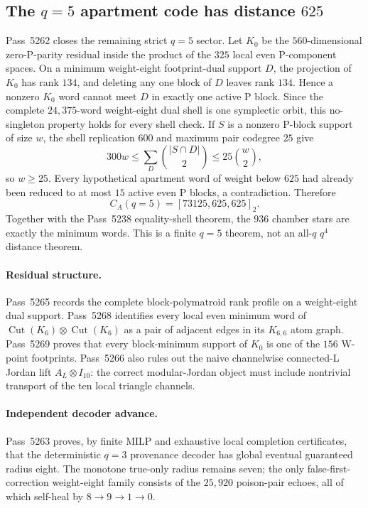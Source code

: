 \subsection{The $q=5$ apartment code has distance $625$}
Pass~5262 closes the remaining strict $q=5$ sector.  Let $K_0$ be the
$560$-dimensional zero-P-parity residual inside the product of the $325$ local
even P-component spaces.  On a minimum weight-eight footprint-dual support $D$,
the projection of $K_0$ has rank $134$, and deleting any one block of $D$ leaves
rank $134$.  Hence a nonzero $K_0$ word cannot meet $D$ in exactly one active
P block.  Since the complete $24{,}375$-word weight-eight dual shell is one
symplectic orbit, this no-singleton property holds for every shell check.
If $S$ is a nonzero P-block support of size $w$, the shell replication $600$ and
maximum pair codegree $25$ give
\[
  300w\le \sum_D { |S\cap D|\choose2}\le 25{w\choose2},
\]
so $w\ge25$.  Every hypothetical apartment word of weight below $625$ had
already been reduced to at most $15$ active even P blocks, a contradiction.
Therefore
\[
  \boxed{C_A(q=5)=[73125,625,625]_2}.
\]
Together with the Pass~5238 equality-shell theorem, the $936$ chamber stars are
exactly the minimum words.  This is a finite $q=5$ theorem, not an all-$q$
$q^4$ distance theorem.

\paragraph{Residual structure.}
Pass~5265 records the complete block-polymatroid rank profile on a weight-eight
dual support.  Pass~5268 identifies every local even minimum word of
$\operatorname{Cut}(K_6)\otimes\operatorname{Cut}(K_6)$ as a pair of adjacent
edges in its $K_{6,6}$ atom graph.  Pass~5269 proves that every block-minimum
support of $K_0$ is one of the $156$ W-point footprints.  Pass~5266 also rules
out the naive channelwise connected-L Jordan lift $A_L\otimes I_{10}$: the
correct modular-Jordan object must include nontrivial transport of the ten local
triangle channels.

\paragraph{Independent decoder advance.}
Pass~5263 proves, by finite MILP and exhaustive local completion certificates,
that the deterministic $q=3$ provenance decoder has global eventual guaranteed
radius eight.  The monotone true-only radius remains seven; the only false-first-
correction weight-eight family consists of the $25{,}920$ poison-pair echoes,
all of which self-heal by $8\to9\to1\to0$.
